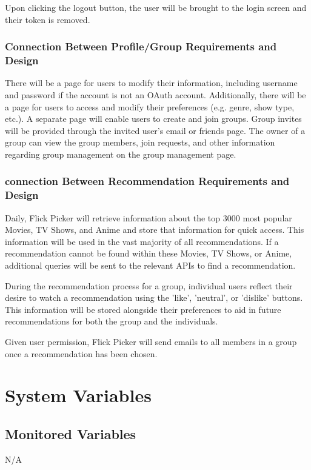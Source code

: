 \documentclass[12pt, titlepage]{article}
\begin{document}
Upon clicking the logout button, the user will be brought to the login screen and their token is removed.

\subsubsection{Connection Between Profile/Group Requirements and Design}
\hspace*{14pt} There will be a page for users to modify their information, including username and password if the account is not an OAuth account. Additionally, there will be a page for users to access and modify their preferences (e.g. genre, show type, etc.). A separate page will enable users to create and join groups. Group invites will be provided through the invited user's email or friends page. The owner of a group can view the group members, join requests, and other information regarding group management on the group management page. 

\subsubsection{connection Between Recommendation Requirements and Design}
\hspace*{14pt} Daily, Flick Picker will retrieve information about the top 3000 most popular Movies, TV Shows, and Anime and store that information for quick access. This information will be used in the vast majority of all recommendations. If a recommendation cannot be found within these Movies, TV Shows, or Anime, additional queries will be sent to the relevant APIs to find a recommendation.

During the recommendation process for a group, individual users reflect their desire to watch a recommendation using the 'like', 'neutral', or 'dislike' buttons. This information will be stored alongside their preferences to aid in future recommendations for both the group and the individuals. 

Given user permission, Flick Picker will send emails to all members in a group once a recommendation has been chosen. 

\section{System Variables}

\subsection{Monitored Variables}
N/A
\end{document}
